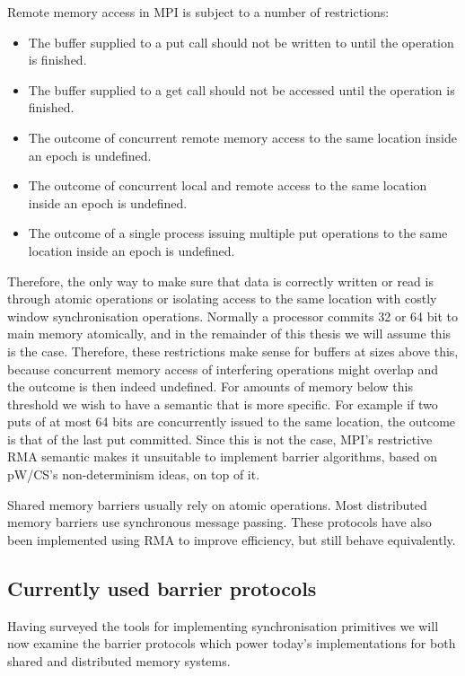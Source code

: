 \documentclass[a4paper, 10pt]{article}
\begin{document}
Remote memory access in MPI is subject to a number of restrictions:
\begin{itemize}
	\item The buffer supplied to a put call should not be written to until the operation is finished.
	\item The buffer supplied to a get call should not be accessed until the operation is finished.
	\item The outcome of concurrent remote memory access to the same location inside an epoch is undefined.
	\item The outcome of concurrent local and remote access to the same location inside an epoch is undefined.
	\item The outcome of a single process issuing multiple put operations to the same location inside an epoch is undefined.
\end{itemize}
Therefore, the only way to make sure that data is correctly written or read is through atomic operations or isolating access to the same location with costly window synchronisation operations.
Normally a processor commits 32 or 64 bit to main memory atomically, and in the remainder of this thesis we will assume this is the case.
Therefore, these restrictions make sense for buffers at sizes above this, because concurrent memory access of interfering operations might overlap and the outcome is then indeed undefined.
For amounts of memory below this threshold we wish to have a semantic that is more specific. For example if two puts of at most 64 bits are concurrently issued to the same location, the outcome is that of the last put committed. Since this is not the case, MPI's restrictive RMA semantic makes it unsuitable to implement barrier algorithms, based on pW/CS's non-determinism ideas, on top of it.

Shared memory barriers usually rely on atomic operations. Most distributed memory barriers use synchronous message passing. These protocols have also been implemented using RMA to improve efficiency, but still behave equivalently.

\subsection{Currently used barrier protocols}
\label{ssec:background-currently-used}
Having surveyed the tools for implementing synchronisation primitives we will now examine the barrier protocols which power today's implementations for both shared and distributed memory systems.
\end{document}
